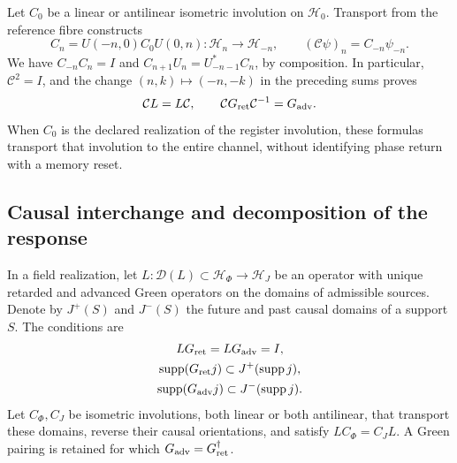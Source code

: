 Let \(C_0\) be a linear or antilinear isometric involution on
\(\mathcal H_0\). Transport from the reference fibre constructs
\[
 C_n=U(-n,0)C_0U(0,n):\mathcal H_n\longrightarrow\mathcal H_{-n},
 \qquad (\mathcal C\psi)_n=C_{-n}\psi_{-n}.
\]
We have \(C_{-n}C_n=I\) and
\(C_{n+1}U_n=U_{-n-1}^*C_n\), by composition.
In particular, \(\mathcal C^2=I\), and the change \((n,k)\mapsto(-n,-k)\)
in the preceding sums proves
\begin{equation}
 \mathcal C L=L\mathcal C,\qquad
 \mathcal C G_{\rm ret}\mathcal C^{-1}=G_{\rm adv}.
 \label{vii:eq:intercambio-green-cronologico}
\end{equation}
When \(C_0\) is the declared realization of the register involution,
these formulas transport that involution to the entire channel, without identifying
phase return with a memory reset.

\subsection{Causal interchange and decomposition of the response}
\label{vii:subsec:green-realizacion-campos}

In a field realization, let
\(L:\mathcal D(L)\subset\mathcal H_\Phi\to\mathcal H_J\)
be an operator with unique retarded and advanced Green operators on the domains of
admissible sources. Denote by \(J^+(S)\) and \(J^-(S)\) the
future and past causal domains of a support \(S\). The conditions are
\[
 \begin{gathered}
 LG_{\rm ret}=LG_{\rm adv}=I,\\
 \operatorname{supp}(G_{\rm ret}j)\subset J^+(\operatorname{supp}j),\\
 \operatorname{supp}(G_{\rm adv}j)\subset J^-(\operatorname{supp}j).
 \end{gathered}
\]
Let \(C_\Phi,C_J\) be isometric involutions, both linear or both
antilinear, that transport these domains,
reverse their causal orientations, and satisfy
\(LC_\Phi=C_JL\). A Green pairing is retained for which
\(G_{\rm adv}=G_{\rm ret}^{\dagger}\).

